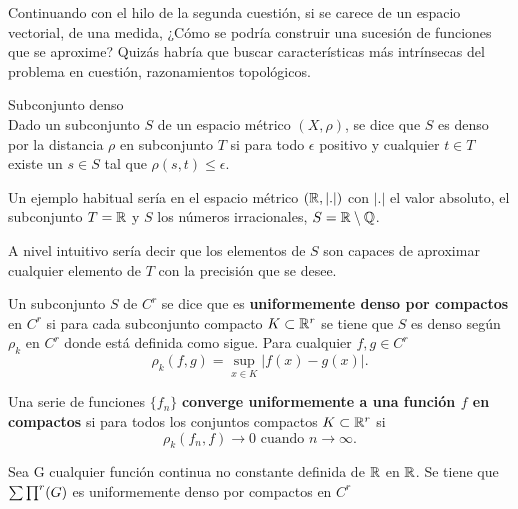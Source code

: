 Continuando con el hilo de la segunda cuestión, si se carece de un espacio vectorial, 
de una medida,  ¿Cómo se podría construir una sucesión de funciones que se aproxime?
Quizás habría que buscar características más intrínsecas del problema en cuestión, 
razonamientos topológicos.

\begin{definicion} Subconjunto denso \\  
    Dado un subconjunto $S$ de un espacio métrico $(X, \rho)$, se dice que $S$ es denso por la distancia $\rho$
    en subconjunto $T$ si para todo $\epsilon$ positivo y cualquier $t \in T$ existe un $s \in S$ tal 
    que $\rho(s,t) \leq \epsilon$. 
\end{definicion}

Un ejemplo habitual sería en el espacio métrico $(\mathbb{R}, |.|)$ con $|.|$ el valor absoluto, el subconjunto 
$T = \mathbb{R}$ y $S$ los números irracionales, $S = \mathbb{R} \setminus \mathbb{Q}$. 

A nivel intuitivo sería decir que los elementos de $S$ son capaces de aproximar cualquier elemento de $T$
con la precisión que se desee. 

\begin{definicion} 
    Un subconjunto $S$ de $C^r$ se dice que es \textbf{uniformemente denso por compactos} en  $C^r$
    si para cada subconjunto compacto $K \subset \mathbb{R}^r$ se tiene que $S$ es denso según $\rho_k$ en $C^r$
    donde está definida como sigue.
    Para cualquier $f,g \in C^r$ 
    \begin{equation}
        \rho _ k (f,g) = \sup_{x \in K} |f(x) - g(x)|.
    \end{equation}
\end{definicion}

\begin{definicion}
    Una serie de funciones $\{f_n\}$ \textbf{converge uniformemente a una función $f$ en compactos} si para 
    todos los conjuntos compactos $K \subset \mathbb{R}^r$ si 
    \begin{equation}
        \rho_k (f_n, f) \longrightarrow 0 \text{ cuando } n \longrightarrow \infty.
    \end{equation} 
\end{definicion}

\begin{teorema}  

    Sea G cualquier función continua no constante definida de $\mathbb{R}$ en $\mathbb{R}$. 
    Se tiene que $\sum \prod^r (G)$ es uniformemente denso por compactos en $C^r$
\end{teorema}

